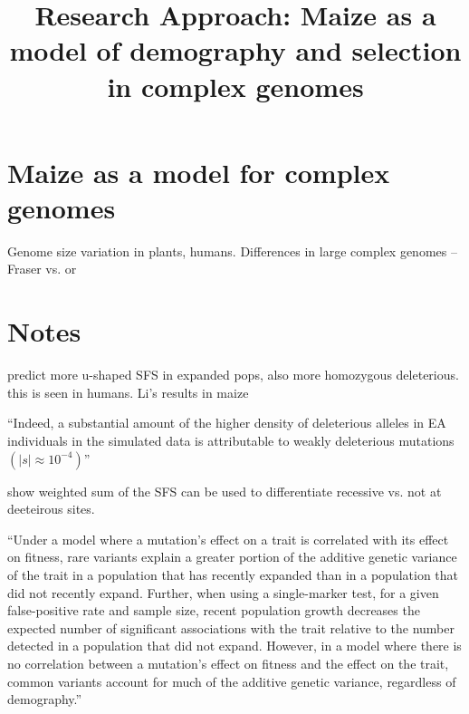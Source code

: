 \documentclass[11pt]{article}
\begin{document}
\title{\vspace{-5ex}Research Approach: Maize as a model of demography and selection in complex genomes\vspace{-4ex}}
\author{}
\date{}
\maketitle



\section*{Maize as a model for complex genomes}

Genome size variation in plants, humans. 
Differences in large complex genomes -- Fraser \citep{fraser2013gene} vs. \citep{pyhajarvi2013complex} or \citep{hancock2011adaptation}

\section*{Notes}

\citep{peischl2015expansion} predict more u-shaped SFS in expanded pops, also more homozygous deleterious. this is seen in humans. Li's results in maize

\citep{fu2014characteristics}
``Indeed, a substantial amount of the higher density of deleterious alleles in EA individuals in the simulated data is attributable to weakly deleterious mutations $(|s| \approx 10^{-4})$''

\citep{balick2013response} show weighted sum of the SFS can be used to differentiate recessive vs. not at deeteirous sites.

\citep{lohmueller2014impact} 
``Under a model where a mutation's effect on a trait is correlated with its effect on fitness, rare variants explain a greater portion of the additive genetic variance of the trait in a population that has recently expanded than in a population that did not recently expand. Further, when using a single-marker test, for a given false-positive rate and sample size, recent population growth decreases the expected number of significant associations with the trait relative to the number detected in a population that did not expand. However, in a model where there is no correlation between a mutation's effect on fitness and the effect on the trait, common variants account for much of the additive genetic variance, regardless of demography.''
\end{document}
